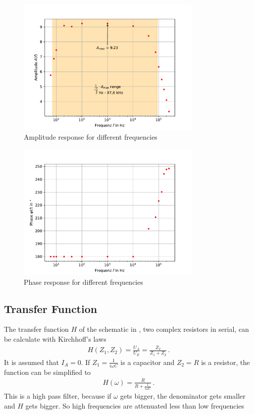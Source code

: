\documentclass[11pt, a4paper]{article}
\begin{document}
\begin{figure}[h]
    \centering
    \includegraphics[width=0.8\textwidth]{plots/Amplitudengang.pdf}
    \caption{Amplitude response for different frequencies}
    \label{fig:Ampresp}
\end{figure}

\begin{figure}[h]
    \centering
    \includegraphics[width=0.8\textwidth]{plots/Phasengang.pdf}
    \caption{Phase response for different frequencies}
    \label{fig:Pharesp}
\end{figure}

\FloatBarrier
\subsection{Transfer Function}
The transfer function $H$ of the schematic in \cite[figure 5]{TRA}, two complex resistors in serial, can be calculate with Kirchhoff's laws
\begin{align}
    H\left(Z_1, Z_2\right) = \frac{U_A}{U_E} = \frac{Z_2}{Z_1 + Z_2} \,.
\end{align}
It is assumed that $I_A = 0$.
If $Z_1 = \frac{1}{i \omega C}$ is a capacitor and $Z_2 = R$ is a resistor, the function can be simplified to
\begin{align}
    H\left( \omega \right) = \frac{R}{R + \frac{1}{i \omega C}}\,.
\end{align}
This is a high pass filter, because if $\omega$ gets bigger, the denominator gets smaller and $H$ gets bigger. So high frequencies are attenuated less than low frequencies
\end{document}
